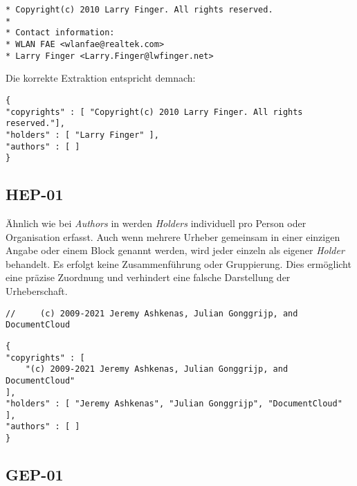 \begin{lstlisting}[keepspaces=true]
* Copyright(c) 2010 Larry Finger. All rights reserved.
*
* Contact information:
* WLAN FAE <wlanfae@realtek.com>
* Larry Finger <Larry.Finger@lwfinger.net>
\end{lstlisting}

Die korrekte Extraktion entspricht demnach:

\begin{lstlisting}[keepspaces=true]
{
"copyrights" : [ "Copyright(c) 2010 Larry Finger. All rights reserved."],
"holders" : [ "Larry Finger" ],
"authors" : [ ]
}
\end{lstlisting}


\subsection{HEP-01}\label{subsec:hep-01}

Ähnlich wie bei \textit{Authors} in  werden \textit{Holders} individuell pro Person oder Organisation erfasst.
Auch wenn mehrere Urheber gemeinsam in einer einzigen Angabe oder einem Block genannt werden, wird jeder einzeln als eigener \textit{Holder} behandelt.
Es erfolgt keine Zusammenführung oder Gruppierung.
Dies ermöglicht eine präzise Zuordnung und verhindert eine falsche Darstellung der Urheberschaft.

\begin{lstlisting}[keepspaces=true]
//     (c) 2009-2021 Jeremy Ashkenas, Julian Gonggrijp, and DocumentCloud
\end{lstlisting}

\begin{lstlisting}[keepspaces=true]
{
"copyrights" : [
    "(c) 2009-2021 Jeremy Ashkenas, Julian Gonggrijp, and DocumentCloud"
],
"holders" : [ "Jeremy Ashkenas", "Julian Gonggrijp", "DocumentCloud" ],
"authors" : [ ]
}
\end{lstlisting}


\subsection{GEP-01}\label{subsec:gep-01}

